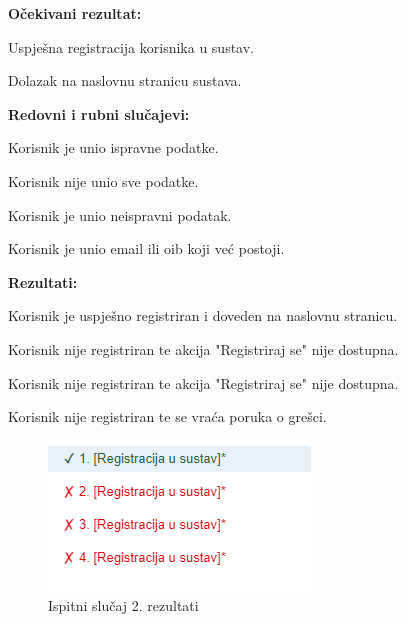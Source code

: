 \noindent \textbf{Očekivani rezultat:}
\begin{packed_enum}
	\item Uspješna registracija korisnika u sustav.
	\item Dolazak na naslovnu stranicu sustava.
\end{packed_enum}

\noindent \textbf{Redovni i rubni slučajevi:}
\begin{packed_enum}
	\item Korisnik je unio ispravne podatke.
	\item Korisnik nije unio sve podatke.
	\item Korisnik je unio neispravni podatak.
	\item Korisnik je unio email ili oib koji već postoji.
\end{packed_enum}

\noindent \textbf{Rezultati:}
\begin{packed_enum}
	\item Korisnik je uspješno registriran i doveden na naslovnu stranicu.
	\item Korisnik nije registriran te akcija "Registriraj se" nije dostupna.
	\item Korisnik nije registriran te akcija "Registriraj se" nije dostupna.
	\item Korisnik nije registriran te se vraća poruka o grešci.
\end{packed_enum}

\begin{figure}[H]
	\includegraphics[scale=0.6]{dijagrami/test2.PNG}
	\centering
	\caption{Ispitni slučaj 2. rezultati}
	\label{fig:myChart}
\end{figure}

